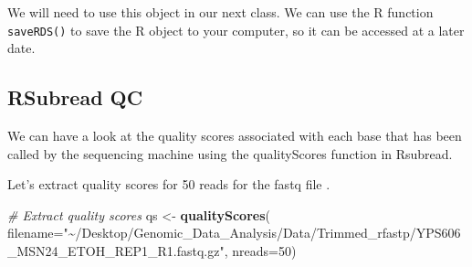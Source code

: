 \documentclass[
]{book}
\newenvironment{Shaded}{\begin{snugshade}}{\end{snugshade}}
\newcommand{\AttributeTok}[1]{\textcolor[rgb]{0.13,0.29,0.53}{#1}}
\newcommand{\CommentTok}[1]{\textcolor[rgb]{0.56,0.35,0.01}{\textit{#1}}}
\newcommand{\ConstantTok}[1]{\textcolor[rgb]{0.56,0.35,0.01}{#1}}
\newcommand{\ControlFlowTok}[1]{\textcolor[rgb]{0.13,0.29,0.53}{\textbf{#1}}}
\newcommand{\DecValTok}[1]{\textcolor[rgb]{0.00,0.00,0.81}{#1}}
\newcommand{\FunctionTok}[1]{\textcolor[rgb]{0.13,0.29,0.53}{\textbf{#1}}}
\newcommand{\NormalTok}[1]{#1}
\newcommand{\OtherTok}[1]{\textcolor[rgb]{0.56,0.35,0.01}{#1}}
\newcommand{\SpecialCharTok}[1]{\textcolor[rgb]{0.81,0.36,0.00}{\textbf{#1}}}
\newcommand{\StringTok}[1]{\textcolor[rgb]{0.31,0.60,0.02}{#1}}
\begin{document}
We will need to use this object in our next class. We can use the R function \texttt{saveRDS()} to save the R object to your computer, so it can be accessed at a later date.

\begin{Shaded}
\end{Shaded}

\hypertarget{rsubread-qc}{%
\subsection{RSubread QC}\label{rsubread-qc}}

We can have a look at the quality scores associated with each base that has been called by the sequencing machine using the qualityScores function in Rsubread.

Let's extract quality scores for 50 reads for the fastq file .

\begin{Shaded}
\begin{Highlighting}[]
\CommentTok{\# Extract quality scores}
\NormalTok{qs }\OtherTok{\textless{}{-}} \FunctionTok{qualityScores}\NormalTok{(}
  \AttributeTok{filename=}\StringTok{"\textasciitilde{}/Desktop/Genomic\_Data\_Analysis/Data/Trimmed\_rfastp/YPS606\_MSN24\_ETOH\_REP1\_R1.fastq.gz"}\NormalTok{,}
                    \AttributeTok{nreads=}\DecValTok{50}\NormalTok{)}
\end{Highlighting}
\end{Shaded}
\end{document}

